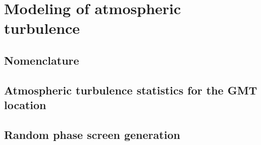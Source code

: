 
\newpage
\section{Modeling of atmospheric turbulence}
\label{sec:atmosphere}

\subsection{Nomenclature}

\subsection{Atmospheric turbulence statistics for the GMT location}
\label{subsec:turb-statistics}


\subsection{Random phase screen generation}
\label{subsec:turb-generation}